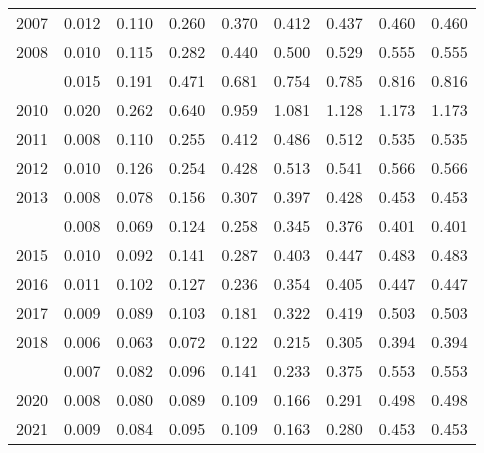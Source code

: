 \documentclass[
]{article}
\begin{document}
\begin{longtable}[t]{lrrrrrrrr}
2007 & 0.012 & 0.110 & 0.260 & 0.370 & 0.412 & 0.437 & 0.460 & 0.460\\
2008 & 0.010 & 0.115 & 0.282 & 0.440 & 0.500 & 0.529 & 0.555 & 0.555\\
\addlinespace
2009 & 0.015 & 0.191 & 0.471 & 0.681 & 0.754 & 0.785 & 0.816 & 0.816\\
2010 & 0.020 & 0.262 & 0.640 & 0.959 & 1.081 & 1.128 & 1.173 & 1.173\\
2011 & 0.008 & 0.110 & 0.255 & 0.412 & 0.486 & 0.512 & 0.535 & 0.535\\
2012 & 0.010 & 0.126 & 0.254 & 0.428 & 0.513 & 0.541 & 0.566 & 0.566\\
2013 & 0.008 & 0.078 & 0.156 & 0.307 & 0.397 & 0.428 & 0.453 & 0.453\\
\addlinespace
2014 & 0.008 & 0.069 & 0.124 & 0.258 & 0.345 & 0.376 & 0.401 & 0.401\\
2015 & 0.010 & 0.092 & 0.141 & 0.287 & 0.403 & 0.447 & 0.483 & 0.483\\
2016 & 0.011 & 0.102 & 0.127 & 0.236 & 0.354 & 0.405 & 0.447 & 0.447\\
2017 & 0.009 & 0.089 & 0.103 & 0.181 & 0.322 & 0.419 & 0.503 & 0.503\\
2018 & 0.006 & 0.063 & 0.072 & 0.122 & 0.215 & 0.305 & 0.394 & 0.394\\
\addlinespace
2019 & 0.007 & 0.082 & 0.096 & 0.141 & 0.233 & 0.375 & 0.553 & 0.553\\
2020 & 0.008 & 0.080 & 0.089 & 0.109 & 0.166 & 0.291 & 0.498 & 0.498\\
2021 & 0.009 & 0.084 & 0.095 & 0.109 & 0.163 & 0.280 & 0.453 & 0.453\\*
\end{longtable}
\end{document}

